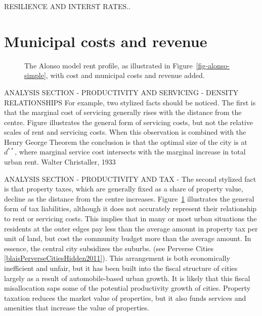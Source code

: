 RESILIENCE AND INTERST RATES..





\section{Municipal costs and revenue}

\begin{figure}
\begin{center}

\end{center}
\caption[The Alonso model with municipal costs and revenue.]{The Alonso model \gls{rent profile}, as illustrated in Figure~\ref{fig-alonso-simple}, with cost and municipal costs and revenue added.} %
\label{fig-municipal-costs}
\end{figure}
 

ANALYSIS SECTION - PRODUCTIVITY AND SERVICING - DENSITY RELATIONSHIPS For example, two stylized facts should be noticed. The first is that the marginal cost of servicing generally  rises with the distance from the centre. Figure illustrates the general form of servicing costs, but not  the relative scales of rent and servicing costs. When this observation is combined with the \gls{Henry George Theorem} the conclusion is that the optimal size of the city  is at  $d^{**}$, where marginal service cost intersects with the marginal increase in total urban rent.  Walter Christaller, 1933

ANALYSIS SECTION - PRODUCTIVITY AND TAX - The second stylized fact is that property taxes, which are generally  fixed as a share of property value, decline as the distance from the centre increases. Figure~\ref{fig-municipal-costs} illustrates the general form of tax liabilities, although it does not  accurately represent their relationship to rent or  servicing costs. This implies that in many or most urban situations the residents at the outer edges pay less than the average amount in property tax per unit of land, but cost  the community budget more than the average amount. In essence, the central city subsidizes the suburbs. (see Perverse Cities \ref{blaisPerverseCitiesHidden2011}). This arrangement is both economically inefficient and unfair, but it has been built into the fiscal structure of cities largely as a result of automobile-based urban growth. It is likely that this fiscal misallocation saps some of the potential productivity growth of cities. Property taxation reduces the market value of properties, but it also funds services and amenities that increase the value of properties. 

